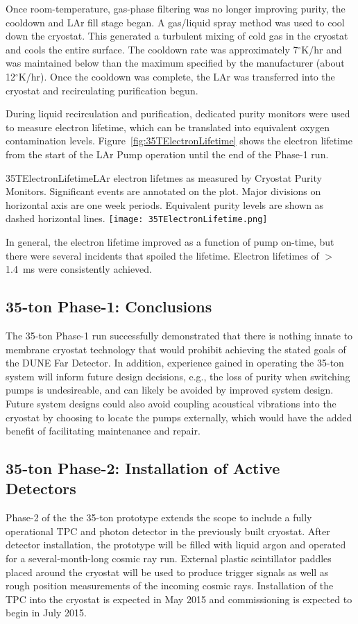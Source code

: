 Once room-temperature, gas-phase filtering was no longer improving
purity, the cooldown and LAr fill stage began.  A gas/liquid spray
method was used to cool down the cryostat.  This generated a turbulent
mixing of cold gas in the cryostat and cools the entire surface.  The
cooldown rate was approximately 7$^\circ$K/hr and was maintained below
than the maximum specified by the manufacturer (about 12$^\circ$K/hr).
Once the cooldown was complete, the LAr was transferred into the
cryostat and recirculating purification begun.

During liquid recirculation and purification, dedicated
purity monitors were used to measure electron lifetime, which can 
be translated into equivalent oxygen contamination levels.
Figure~\ref{fig:35TElectronLifetime} shows the electron lifetime from the start of the
LAr Pump operation until the end of the Phase-1 run. 
\begin{cdrfigure}{35TElectronLifetime}{LAr electron lifetmes as measured by 
Cryostat Purity Monitors. Significant events are annotated on the plot. Major divisions on horizontal axis 
are one week periods. Equivalent purity levels are shown as dashed horizontal lines.}
  \texttt{[image: 35TElectronLifetime.png]}
\end{cdrfigure}
In general, the electron lifetime improved as a function of pump 
on-time, but there were several incidents that spoiled the lifetime.
Electron lifetimes of $>$1.4~ms were consistently achieved.


\subsection{35-ton Phase-1: Conclusions}
The 35-ton Phase-1 run successfully demonstrated that there is nothing innate to
membrane cryostat technology that would prohibit achieving the stated goals of the
DUNE Far Detector. In addition, experience gained in operating the 35-ton system
will inform future design decisions, e.g., the loss of purity when switching pumps is
undesireable, and can likely be avoided by improved system design. Future system
designs could also avoid coupling acoustical vibrations into the cryostat by choosing
to locate the pumps externally, which would have the added benefit of facilitating
maintenance and repair.

\subsection{35-ton Phase-2: Installation of Active Detectors}
Phase-2 of the the 35-ton prototype extends the scope to include a fully operational TPC and
photon detector in the previously built cryostat.
After detector installation, the prototype will be filled with liquid argon and 
operated for a several-month-long cosmic ray run. 
External plastic scintillator paddles placed around the cryostat will be used to produce
trigger signals as well as rough position measurements of the incoming cosmic rays.
Installation of the TPC into the cryostat is expected in May 2015 and 
commissioning is expected to begin in July 2015.

